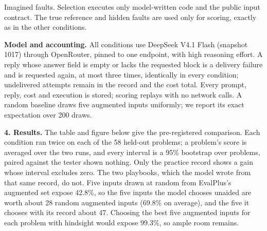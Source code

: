 \documentclass[11pt]{article}
\begin{document}
\begin{center}

{\footnotesize Imagined faults. Selection executes only model-written code and
the public input contract. The true reference and hidden faults are used only
for scoring, exactly as in the other conditions.}
\end{center}

\textbf{Model and accounting.} All conditions use DeepSeek V4.1 Flash (snapshot
1017) through OpenRouter, pinned to one endpoint, with high reasoning effort.
A reply whose answer field is empty or lacks the requested block is a delivery
failure and is requested again, at most three times, identically in every
condition; undelivered attempts remain in the record and the cost total.
Every prompt, reply, cost and execution is stored; scoring replays with no
network calls. A random baseline draws five augmented inputs uniformly; we
report its exact expectation over 200 draws.


\hypertarget{results}{}
\textbf{4. Results.}
The table and figure below give the pre-registered comparison. Each condition
ran twice on each of the 58 held-out problems; a problem's score is averaged over
the two runs, and every interval is a 95\% bootstrap over problems, paired against
the tester shown nothing. Only the practice record shows a gain whose interval
excludes zero. The two playbooks, which the model wrote from that same record,
do not. Five inputs drawn at random from EvalPlus's augmented set expose 42.8\%,
so the five inputs the model chooses unaided are worth about 28 random augmented
inputs (69.8\% on average), and the five it chooses with its record about 47. Choosing the best five augmented inputs for each
problem with hindsight would expose 99.3\%, so ample room remains.
\end{document}
